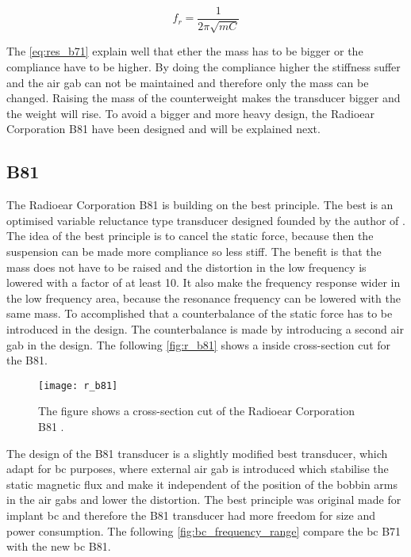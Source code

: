 \begin{equation}\label{eq:res_b71}
f_r=\frac{1}{2 \pi \sqrt{m C}}
\end{equation}

    \startexplain
    \stopexplain

The \autoref{eq:res_b71} explain well that ether the mass has to be bigger or the compliance have to be higher. By doing the compliance higher the stiffness suffer and the air gab can not be maintained and therefore only the mass can be changed. Raising the mass of the counterweight makes the transducer bigger and the weight will rise. To avoid a bigger and more heavy design, the Radioear Corporation B81 have been designed and will be explained next. 


\subsection{B81}
The Radioear Corporation B81 is building on the \gls{best} principle. The \gls{best} is an optimised variable reluctance type transducer designed founded by the author of \citep{the_balanced_2003}. The idea of the \gls{best} principle is to cancel the static force, because then the suspension can be made more compliance so less stiff. The benefit is that the mass does not have to be raised and the distortion in the low frequency is lowered with a factor of at least 10. It also make the frequency response wider in the low frequency area, because the resonance frequency can be lowered with the same mass. To accomplished that a counterbalance of the static force has to be introduced in the design. The counterbalance is made by introducing a second air gab in the design. The following \autoref{fig:r_b81} shows a inside cross-section cut for the B81.

 \begin{figure}[H]
	\centering
		\texttt{[image: r\_b81]}
		\caption{The figure shows a cross-section cut of the Radioear Corporation B81  \citep{the_balanced_2003}.}
		\label{fig:r_b81}
\end{figure}

The design of the B81 transducer is a slightly modified \gls{best} transducer, which adapt for \gls{bc} purposes, where external air gab is introduced which stabilise the static magnetic flux and make it independent of the position of the bobbin arms in the air gabs and lower the distortion.  The \gls{best} principle was original made for implant \gls{bc} and therefore the B81 transducer had more freedom for size and power consumption. The following \autoref{fig:bc_frequency_range} compare the \gls{bc} B71 with the new \gls{bc} B81.


